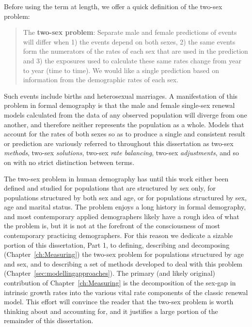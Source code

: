 Before using the term at length, we offer a quick definition of the two-sex
problem:

\begin{singlespace}
\begin{quote}
The \textbf{two-sex problem}: Separate male and female predictions of events
will differ when 1) the events depend on both sexes, 2) the same events 
form the numerators of the rates of each sex that are used in the prediction and
3) the exposures used to calculate these same rates change from year to year
(time to time). We would like a single prediction based on information from the
demographic rates of each sex.
\end{quote}
\end{singlespace}

 Such events include births and heterosexual marriages.
 A manifestation of this problem in formal demography is that the male
 and female single-sex renewal models calculated from the data of any observed 
 population will diverge from one another, and therefore neither represents
 the population as a whole. Models that account for the rates of both sexes
 so as to produce a single and consistent result or prediction are
 variously referred to throughout this dissertation as two-sex \textit{methods},
 two-sex \textit{solutions}, two-sex \textit{rate balancing}, two-sex 
 \textit{adjustments}, and so on with no strict distinction between terms.
 
 The two-sex problem in human demography has until this work either been defined 
 and studied for populations that are structured by sex only, for populations
structured by both sex and age, or for populations structured by sex, age and
marital status. The problem enjoys a long history in formal demography, and most
contemporary applied demographers likely have a rough idea of what the problem
is, but it is not at the forefront of the consciousness of most contemporary
practicing demographers. For this reason we dedicate a sizable portion of 
this dissertation, Part 1, to defining, describing
and decomposing (Chapter~\ref{ch:Measuring}) the two-sex problem for populations
structured by age and sex, and to describing a set of methods developed to deal
with this problem (Chapter~\ref{sec:modellingapproaches}). The primary (and likely
original) contribution of Chapter~\ref{ch:Measuring} is the decomposition of the 
sex-gap in intrinsic growth rates into the various vital rate components of the 
classic renewal model. This effort will convince the reader that the two-sex
problem is worth thinking about and accounting for, and it justifies a large
portion of the remainder of this dissertation.

